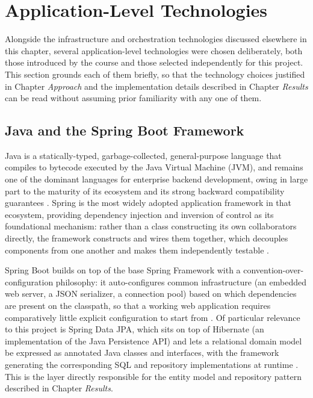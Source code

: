 \documentclass[twoside]{supsistudent}
\begin{document}
\section{Application-Level Technologies}
Alongside the infrastructure and orchestration technologies discussed elsewhere in this chapter, several application-level technologies were chosen deliberately, both those introduced by the course and those selected independently for this project. This section grounds each of them briefly, so that the technology choices justified in Chapter \emph{Approach} and the implementation details described in Chapter \emph{Results} can be read without assuming prior familiarity with any one of them.

\subsection{Java and the Spring Boot Framework}
Java is a statically-typed, garbage-collected, general-purpose language that compiles to bytecode executed by the Java Virtual Machine (JVM), and remains one of the dominant languages for enterprise backend development, owing in large part to the maturity of its ecosystem and its strong backward compatibility guarantees \cite{gosling2005jls, bracha1998future}. Spring is the most widely adopted application framework in that ecosystem, providing dependency injection and inversion of control as its foundational mechanism: rather than a class constructing its own collaborators directly, the framework constructs and wires them together, which decouples components from one another and makes them independently testable \cite{johnson2002expert}.

Spring Boot builds on top of the base Spring Framework with a convention-over-configuration philosophy: it auto-configures common infrastructure (an embedded web server, a JSON serializer, a connection pool) based on which dependencies are present on the classpath, so that a working web application requires comparatively little explicit configuration to start from \cite{springboot2026}. Of particular relevance to this project is Spring Data JPA, which sits on top of Hibernate (an implementation of the Java Persistence API) and lets a relational domain model be expressed as annotated Java classes and interfaces, with the framework generating the corresponding SQL and repository implementations at runtime \cite{fowler2002poeaa, tudose2021orm}. This is the layer directly responsible for the entity model and repository pattern described in Chapter \emph{Results}.
\end{document}
